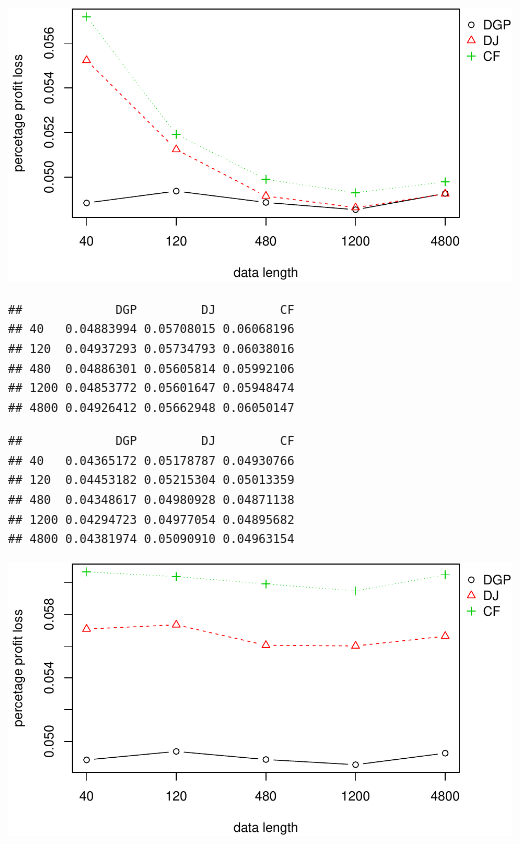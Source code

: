 \documentclass[
]{article}
\begin{document}
\includegraphics{information-plot_files/figure-latex/SAR(3)(1)_4-1.pdf}

\begin{verbatim}
##             DGP         DJ         CF
## 40   0.04883994 0.05708015 0.06068196
## 120  0.04937293 0.05734793 0.06038016
## 480  0.04886301 0.05605814 0.05992106
## 1200 0.04853772 0.05601647 0.05948474
## 4800 0.04926412 0.05662948 0.06050147
\end{verbatim}

\begin{verbatim}
##             DGP         DJ         CF
## 40   0.04365172 0.05178787 0.04930766
## 120  0.04453182 0.05215304 0.05013359
## 480  0.04348617 0.04980928 0.04871138
## 1200 0.04294723 0.04977054 0.04895682
## 4800 0.04381974 0.05090910 0.04963154
\end{verbatim}

\includegraphics{information-plot_files/figure-latex/es-1.pdf}
\end{document}
